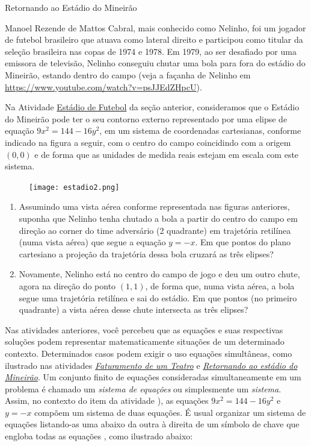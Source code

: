 \begin{task}{Retornando ao Estádio do Mineirão}
\label{estadio2}

Manoel Rezende de Mattos Cabral, mais conhecido como Nelinho, foi um jogador de futebol brasileiro que atuava como lateral direito e participou como titular da seleção brasileira nas copas de 1974 e 1978. Em 1979, ao ser desafiado por uma emissora de televisão, Nelinho conseguiu chutar uma bola para fora do estádio do Mineirão, estando dentro do campo (veja a façanha de Nelinho em \url{https://www.youtube.com/watch?v=psJJEdZHpcU}).


Na Atividade \hyperref[estadio]{Estádio de Futebol} da seção anterior, consideramos que o Estádio do Mineirão pode ter o seu contorno externo representado por uma elipse de equação $9x^2 = 144 - 16y^2$, em um sistema de coordenadas cartesianas, conforme indicado na figura a seguir, com o centro do campo coincidindo com a origem $(0,0)$ e de forma que as unidades de medida reais estejam em escala com este sistema.

\begin{figure}[H]
\centering

\noindent\texttt{[image: estadio2.png]}
\end{figure}
\begin{enumerate} 

\item{}
Assumindo uma vista aérea conforme representada nas figuras anteriores, suponha que Nelinho tenha chutado a bola a partir do centro do campo em direção ao corner do time adversário (2 quadrante) em trajetória retilínea (numa vista aérea) que segue a equação $y = -x$. Em que pontos do plano cartesiano a projeção da trajetória dessa bola cruzará as três elipses?

\item{}
Novamente, Nelinho está no centro do campo de jogo e deu um outro chute, agora na direção do ponto $(1,1)$, de forma que, numa vista aérea, a bola segue uma trajetória retilínea e sai do estádio. Em que pontos (no primeiro quadrante) a vista aérea desse chute intersecta as três elipses?

\end{enumerate}
\end{task}


\label{\detokenize{AF107-2:organizando-sistemas-de-equações}}\label{\detokenize{AF107-2::doc}}

Nas atividades anteriores, você percebeu que as equações e suas respectivas soluções podem representar matematicamente situações de um determinado contexto. Determinados casos podem exigir o uso equações simultâneas, como ilustrado nas atividades \hyperref[teatro]{\textit{Faturamento de um Teatro}} e \hyperref[estadio2]{\textit{Retornando ao estádio do Mineirão}}. Um conjunto finito de equações consideradas simultaneamente em um problema é chamado um \emph{sistema de equações} ou simplesmente um \emph{sistema}. Assim, no contexto do item  da atividade ), as equações $9x^2 = 144 - 16y^2$ e $y = -x$ compõem um sistema de duas equações. É usual organizar um sistema de equações listando-as uma abaixo da outra à direita de um símbolo de chave que engloba todas as equações , como ilustrado abaixo:

